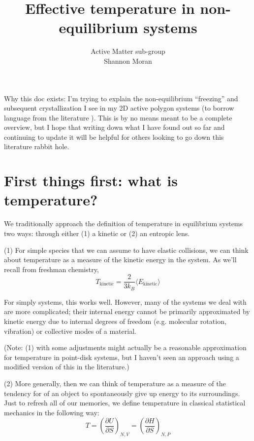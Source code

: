 \documentclass[11pt]{article}   	%
\title{Effective temperature in non-equilibrium systems}
\author{Active Matter sub-group \\ Shannon Moran}
\begin{document}
\maketitle

Why this doc exists: I'm trying to explain the non-equilibrium ``freezing'' and subsequent crystallization I see in my 2D active polygon systems (to borrow language from the literature \cite{BialkeEA_2012_PRL, PalacciEA_2013_Science}). This is by no means meant to be a complete overview, but I hope that writing down what I have found out so far and continuing to update it will be helpful for others looking to go down this literature rabbit hole.


\section{First things first: what is temperature?}

We traditionally approach the definition of temperature in equilibrium systems two ways: through either (1) a kinetic or (2) an entropic lens.

(1) For simple species that we can assume to have elastic collisions, we can think about temperature as a measure of the kinetic energy in the system. As we'll recall from freshman chemistry,
\begin{equation}
T_\text{kinetic} = \frac{2}{3k_B}\langle{E_\text{kinetic}}\rangle
\end{equation}

For simply systems, this works well. However, many of the systems we deal with are more complicated; their internal energy cannot be primarily approximated by kinetic energy due to internal degrees of freedom (e.g. molecular rotation, vibration) or collective modes of a material.

(Note: (1) with some adjustments might actually be a reasonable approximation for temperature in point-disk systems, but I haven't seen an approach using a modified version of this in the literature.)

(2) More generally, then we can think of temperature as a measure of the tendency for of an object to spontaneously give up energy to its surroundings. Just to refresh all of our memories, we define temperature in classical statistical mechanics in the following way:
\begin{equation}
T = \left(\frac{\partial U}{\partial S}\right)_{N,V} = \left(\frac{\partial H}{\partial S}\right)_{N,P}
\end{equation}
\end{document}
